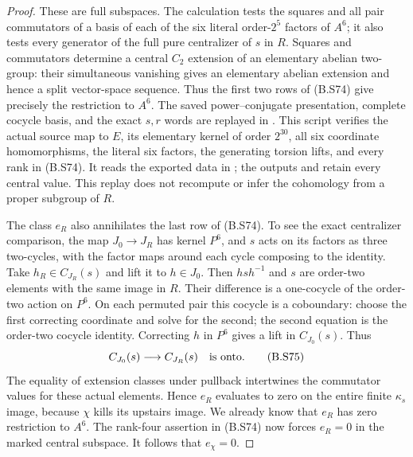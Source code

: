 \begin{proof}
These are full subspaces.  The calculation tests the
squares and all pair commutators of a basis of each
of the six literal order-$2^5$ factors of $A^6$;
it also tests every generator of the full pure
centralizer of $s$ in $R$.  Squares and commutators
determine a central $C_2$ extension of an elementary
abelian two-group: their simultaneous vanishing gives
an elementary abelian extension and hence a split
vector-space sequence.  Thus the first two rows of
(B.S74) give precisely the restriction to $A^6$.
The saved power--conjugate presentation, complete
cocycle basis, and the exact $s,r$ words are replayed
in .
This script verifies the actual source map to $E$,
its elementary kernel of order $2^{30}$, all six
coordinate homomorphisms, the literal six factors,
the generating torsion lifts, and every rank in
(B.S74).  It reads the exported data in
;
the outputs
and 
retain every central value.  This replay does not
recompute or infer the cohomology from a proper
subgroup of $R$.

The class $e_R$ also annihilates the last row of
(B.S74).  To see the exact centralizer comparison,
the map $J_0\to J_R$ has kernel $P^6$, and $s$ acts
on its factors as three two-cycles, with the factor
maps around each cycle composing to the identity.
Take $h_R\in C_{J_R}(s)$ and lift it to $h\in J_0$.
Then $hsh^{-1}$ and $s$ are order-two elements with
the same image in $R$.  Their difference is a
one-cocycle of the order-two action on $P^6$.
On each permuted pair this cocycle is a coboundary:
choose the first correcting coordinate and solve for
the second; the second equation is the order-two
cocycle identity.  Correcting $h$ in $P^6$ gives
a lift in $C_{J_0}(s)$.  Thus
\[
                       C_{J_0}(s)\longrightarrow C_{J_R}(s)
                     \quad\hbox{is onto}.                    \tag{B.S75}
\]
The equality of extension classes under pullback
intertwines the commutator values for these actual
elements.  Hence $e_R$ evaluates to zero on the entire
finite $\kappa_s$ image, because $\chi$ kills its
upstairs image.  We already know that $e_R$ has zero
restriction to $A^6$.  The rank-four assertion in
(B.S74) now forces $e_R=0$ in the marked central
subspace.  It follows that $e_\chi=0$.


\end{proof}
